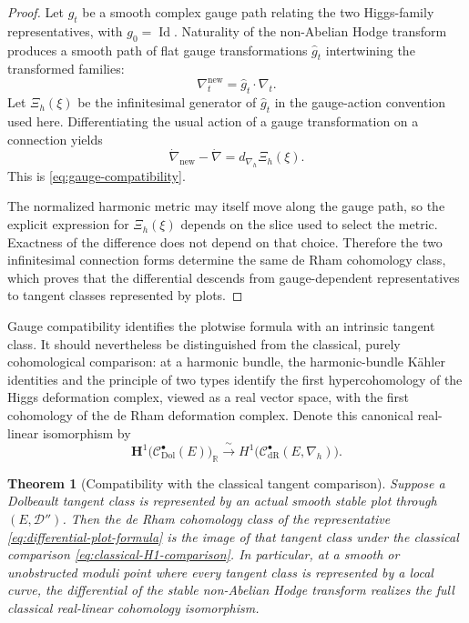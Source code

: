 \documentclass[11pt,reqno]{amsart}
\newtheorem{theorem}{Theorem}[section]
\theoremstyle{definition}
\theoremstyle{remark}
\newcommand{\R}{\mathbb R}
\newcommand{\cC}{\mathcal C}
\newcommand{\cD}{\mathcal D}
\newcommand{\Id}{\operatorname{Id}}
\newcommand{\Dol}{\mathrm{Dol}}
\newcommand{\dR}{\mathrm{dR}}
\begin{document}
\begin{proof}
Let $g_t$ be a smooth complex gauge path relating the two Higgs-family representatives, with $g_0=\Id$.  Naturality of the non-Abelian Hodge transform produces a smooth path of flat gauge transformations $\widehat g_t$ intertwining the transformed families:
\[
  \nabla_t^{\mathrm{new}}=\widehat g_t\cdot\nabla_t.
\]
Let $\Xi_h(\xi)$ be the infinitesimal generator of $\widehat g_t$ in the gauge-action convention used here.  Differentiating the usual action of a gauge transformation on a connection yields
\[
  \dot\nabla_{\mathrm{new}}-\dot\nabla
  =d_{\nabla_h}\Xi_h(\xi).
\]
This is \eqref{eq:gauge-compatibility}.

The normalized harmonic metric may itself move along the gauge path, so the explicit expression for $\Xi_h(\xi)$ depends on the slice used to select the metric.  Exactness of the difference does not depend on that choice.  Therefore the two infinitesimal connection forms determine the same de Rham cohomology class, which proves that the differential descends from gauge-dependent representatives to tangent classes represented by plots.
\end{proof}


Gauge compatibility identifies the plotwise formula with an intrinsic
tangent class.  It should nevertheless be distinguished from the
classical, purely cohomological comparison: at a harmonic bundle, the
harmonic-bundle K\"ahler identities and the principle of two types
identify the first hypercohomology of the Higgs deformation complex,
viewed as a real vector space, with the first cohomology of the de Rham
deformation complex.  Denote this canonical real-linear isomorphism by
\begin{equation}\label{eq:classical-H1-comparison}
  \mathbf H^1\bigl(\cC^\bullet_{\Dol}(E)\bigr)_{\R}
  \xrightarrow{\;\sim\;}
  H^1\bigl(\cC^\bullet_{\dR}(E,\nabla_h)\bigr).
\end{equation}

\begin{theorem}[Compatibility with the classical tangent comparison]\label{thm:harmonic-representatives}
Suppose a Dolbeault tangent class is represented by an actual smooth stable plot through $(E,\cD'')$.  Then the de Rham cohomology class of the representative \eqref{eq:differential-plot-formula} is the image of that tangent class under the classical comparison \eqref{eq:classical-H1-comparison}.  In particular, at a smooth or unobstructed moduli point where every tangent class is represented by a local curve, the differential of the stable non-Abelian Hodge transform realizes the full classical real-linear cohomology isomorphism.
\end{theorem}
\end{document}
